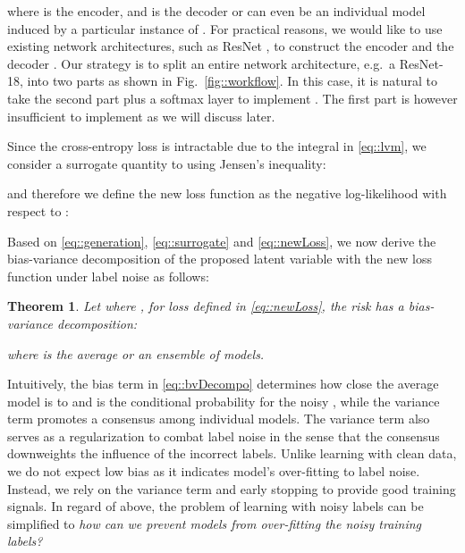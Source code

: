 \documentclass[journal]{IEEEtran}
\newtheorem{theorem}{Theorem}
\begin{document}
where  is the encoder, and  is the decoder or can even be an individual model induced by a particular instance of .
For practical reasons, we would like to use existing network architectures, such as ResNet \cite{he2016deep}, to construct the encoder  and the decoder .
Our strategy is to split an entire network architecture, e.g.~a ResNet-18, into two parts as shown in Fig.~\ref{fig::workflow}.
In this case, it is natural to take the second part plus a softmax layer to implement .
The first part is however insufficient to implement  as we will discuss later.

Since the cross-entropy loss  is intractable due to the integral in \eqref{eq::lvm}, we consider a surrogate quantity to  using Jensen's inequality:

and therefore we define the new loss function as the negative log-likelihood with respect to :


Based on \eqref{eq::generation}, \eqref{eq::surrogate} and \eqref{eq::newLoss}, we now derive the bias-variance decomposition of the proposed latent variable with the new loss function under label noise as follows:
\begin{theorem} \label{thm::decomp}
Let  where , for loss  defined in \eqref{eq::newLoss}, the risk has a bias-variance decomposition:

where  is the average or an ensemble of models.
\end{theorem}



Intuitively, the bias term in \eqref{eq::bvDecompo} determines how close the average model  is to  and  is the conditional probability for the noisy , while the variance term promotes a consensus among individual models.
The variance term also serves as a regularization to combat label noise in the sense that the consensus downweights the influence of the incorrect labels.
Unlike learning with clean data, we do not expect low bias as it indicates model's over-fitting to label noise.
Instead, we rely on the variance term and early stopping to provide good training signals.
In regard of above, the problem of learning with noisy labels can be simplified to \textit{how can we prevent models from over-fitting the noisy training labels?}
\end{document}
